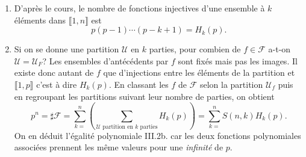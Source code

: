 \begin{enumerate}
\begin{enumerate}
  \item D'après le cours, le nombre de fonctions injectives d'une ensemble à $k$ éléments dans $\llbracket 1,n \rrbracket$ est 
  \[
   p(p-1)\cdots(p-k+1) = H_k(p).
  \]
  \item Si on se donne une partition $\mathcal{U}$ en $k$ parties, pour combien de $f\in \mathcal{F}$ a-t-on $\mathcal{U} = \mathcal{U}_F$? Les ensembles d'antécédents par $f$ sont fixés mais pas les images. Il existe donc autant de $f$ que d'injections entre les éléments de la partition et $\llbracket 1,p \rrbracket$ c'est à dire $H_k(p)$. 
En classant les $f$ de $\mathcal{F}$ selon la partition $\mathcal{U}_f$ puis en regroupant les partitions suivant leur nombre de parties, on obtient
\[
p^n = \sharp \mathcal{F} = \sum_{k= }^n\left(\sum_{\mathcal{U} \text{ partition en $k$ parties}} H_k(p) \right) 
= \sum_{k= }^n S(n,k)H_k(p).
\]
On en déduit l'égalité polynomiale III.2b. car les deux fonctions polynomiales associées prennent les même valeurs pour une \emph{infinité} de $p$.
 
 \end{enumerate}
\end{enumerate}

